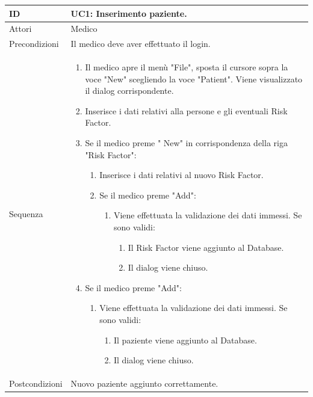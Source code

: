 \documentclass[a4paper, 11pt]{article}
\newcommand{\usecase}[5]{%
	\begin{table}[H]
		\centering
		\renewcommand{\familydefault}{\ttdefault}\normalfont
		\begin{tabular}{| >{\fontseries{b}\selectfont} p{0.3\textwidth} | L |}
			\hline
			ID&{#1}\\\hline
			Attori&{#2}\\\hline
			Precondizioni&{#3}\\\hline
			Sequenza&{#4}\\\hline
			Postcondizioni&{#5}\\\hline
		\end{tabular}
	\end{table}
	
}
\begin{document}
		\usecase{UC1: Inserimento paziente.}
		{Medico}
		{Il medico deve aver effettuato il login.}
		{%
			\begin{enumerate}[label*=\arabic*., nosep]
				\item Il medico apre il menù "File", sposta il cursore sopra la voce "New" scegliendo la voce "Patient". Viene visualizzato il dialog corrispondente.
				\item Inserisce i dati relativi alla persone e gli eventuali Risk Factor.
				\item Se il medico preme " New" in corrispondenza della riga "Risk Factor":
				\begin{enumerate}[label*=\arabic*., nosep]
					\item Inserisce i dati relativi al nuovo Risk Factor.
					\item Se il medico preme "Add":
					\begin{enumerate}[label*=\arabic*., nosep]
						\item Viene effettuata la validazione dei dati immessi. Se sono validi:	
						\begin{enumerate}[label*=\arabic*., nosep]
							\item Il Risk Factor viene aggiunto al Database.
							\item Il dialog viene chiuso.
						\end{enumerate}
					\end{enumerate}
				\end{enumerate}
				\item Se il medico preme "Add":				
				\begin{enumerate}[label*=\arabic*., nosep]
					\item Viene effettuata la validazione dei dati immessi. Se sono validi:	
					\begin{enumerate}[label*=\arabic*., nosep]
						\item Il paziente viene aggiunto al Database.
						\item Il dialog viene chiuso.
					\end{enumerate}
				\end{enumerate}
			\end{enumerate}
		}
		{Nuovo paziente aggiunto correttamente.}
		
\end{document}

